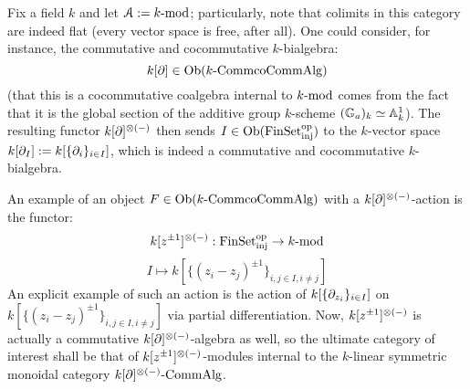             \begin{example}
                Fix a field $k$ and let $\calA := k\mod$; particularly, note that colimits in this category are indeed flat (every vector space is free, after all). One could consider, for instance, the commutative and cocommutative $k$-bialgebra:
                    $$k[\del] \in \Ob(k\-\Comm\co\Comm\Alg)$$
                (that this is a cocommutative coalgebra internal to $k\mod$ comes from the fact that it is the global section of the additive group $k$-scheme $(\G_a)_k \cong \A^1_k$). The resulting functor $k[\del]^{\tensor (-)}$ then sends $I \in \Ob(\Fin\Sets_{\inj}^{\op})$ to the $k$-vector space $k[\del_I] := k[\{\del_i\}_{i \in I}]$, which is indeed a commutative and cocommutative $k$-bialgebra.
                
                An example of an object $F \in \Ob(k\-\Comm\co\Comm\Alg)$ with a $k[\del]^{\tensor (-)}$-action is the functor:
                    $$k[z^{\pm 1}]^{\tensor (-)}: \Fin\Sets_{\inj}^{\op} \to k\mod$$
                    $$I \mapsto k[\{(z_i - z_j)^{\pm 1}\}_{i, j \in I, i \not = j}]$$
                An explicit example of such an action is the action of $k[\{\del_{z_i}\}_{i \in I}]$ on $k[\{(z_i - z_j)^{\pm 1}\}_{i, j \in I, i \not = j}]$ via partial differentiation. Now, $k[z^{\pm 1}]^{\tensor (-)}$ is actually a commutative $k[\del]^{\tensor (-)}$-algebra as well, so the ultimate category of interest shall be that of $k[z^{\pm 1}]^{\tensor (-)}$-modules internal to the $k$-linear symmetric monoidal category $k[\del]^{\tensor (-)}\-\Comm\Alg$. 
            \end{example}
            
